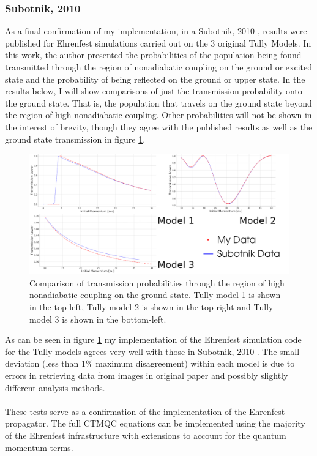 \subsubsection{Subotnik, 2010}
As a final confirmation of my implementation, in a Subotnik, 2010 \cite{SubotnikMomentumEhrenfest}, results were published for Ehrenfest simulations carried out on the 3 original Tully Models. In this work, the author presented the probabilities of the population being found transmitted through the region of nonadiabatic coupling on the ground or excited state and the probability of being reflected on the ground or upper state. In the results below, I will show comparisons of just the transmission probability onto the ground state. That is, the population that travels on the ground state beyond the region of high nonadiabatic coupling. Other probabilities will not be shown in the interest of brevity, though they agree with the published results as well as the ground state transmission in figure \ref{fig:SubotnikComparison}.
\begin{figure}[ht]
  \includegraphics[width=\textwidth]{img/CTMQC/TullyModels/Ehrenfest_vs_Subotnik.png}
  \caption{\label{fig:SubotnikComparison}Comparison of transmission probabilities through the region of high nonadiabatic coupling on the ground state. Tully model 1 is shown in the top-left, Tully model 2 is shown in the top-right and Tully model 3 is shown in the bottom-left.}
\end{figure}
As can  be seen in figure \ref{fig:SubotnikComparison} my implementation of the Ehrenfest simulation code for the Tully models agrees very well with those in Subotnik, 2010 \cite{SubotnikMomentumEhrenfest}. The small deviation (less than 1\% maximum disagreement) within each model is due to errors in retrieving data from images in original paper and possibly slightly different analysis methods.
\\\\
These tests serve as a confirmation of the implementation of the Ehrenfest propagator. The full CTMQC equations can be implemented using the majority of the Ehrenfest infrastructure with extensions to account for the quantum momentum terms.

